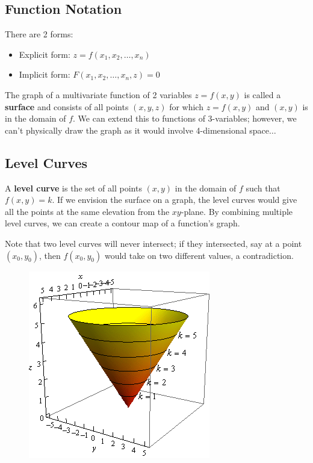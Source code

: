 \documentclass[12pt]{article}
\begin{document}
\subsection{Function Notation}
There are 2 forms:
\begin{itemize}
\item Explicit form: $z = f(x_1,x_2,\dots,x_n)$
\item Implicit form: $F(x_1,x_2,\dots,x_n,z) = 0$
\end{itemize}

The graph of a multivariate function of 2 variables $z=f(x,y)$ is called a \textbf{surface} and consists of all points $(x,y,z)$ for which $z = f(x,y)$ and $(x,y)$ is in the domain of $f$. We can extend this to functions of 3-variables; however, we can't physically draw the graph as it would involve 4-dimensional space$\dots$

\subsection{Level Curves}
A \textbf{level curve} is the set of all points $(x,y)$ in the domain of $f$  such that $f(x,y) = k$. If we envision the surface on a graph, the level curves would give all the points at the same elevation from the $xy$-plane. By combining multiple level curves, we can create a contour map of a function's graph.

Note that two level curves will never intersect; if they intersected, say at a point $(x_0,y_0)$, then $f(x_0,y_0)$ would take on two different values, a contradiction.

\begin{figure}[h!]
\centering
\includegraphics[scale=0.5]{level}
\end{figure}
\end{document}
